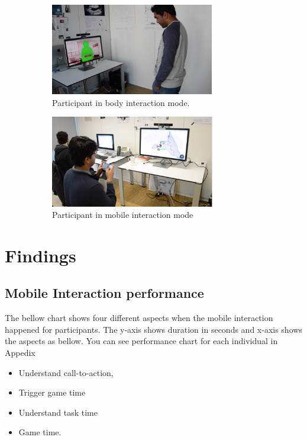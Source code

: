 \begin{figure}[H]
    \centering
    \begin{subfigure}[H]{0.45\textwidth}
        \centering
        \includegraphics[width=\textwidth,height=4cm]{Figures/6/singleBody}
        \caption{Participant in body interaction mode.}
        \label{fig:singlebody}
    \end{subfigure}
    \hfill
    \begin{subfigure}[H]{0.45\textwidth}
        \centering
        \includegraphics[width=\textwidth,height=4cm]{Figures/6/singleMobile}
        \caption{Participant in mobile interaction mode}
        \label{fig:singleMobile}
    \end{subfigure}
    \caption{}
    \label{fig:Focus_group_room}
\end{figure}


\section{Findings}

\subsection{Mobile Interaction performance}
The bellow chart shows four different aspects when the mobile interaction happened for participants. The y-axis shows duration in seconds and x-axis shows the aspects as bellow. You can see performance chart for each individual in Appedix 
\begin{itemize}
\item Understand call-to-action,
\item Trigger game time
\item Understand task time
\item Game time.
\end{itemize}

